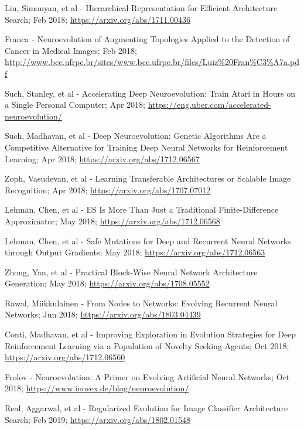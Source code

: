 \documentclass[journal, a4paper]{IEEEtran}
\begin{document}
\begin{thebibliography}{5}
    Liu, Simonyan, et al - Hierarchical Representation for Efficient Architecture Search; Feb 2018;
    \url{https://arxiv.org/abs/1711.00436}

    Franca - Neuroevolution of Augmenting Topologies Applied to the Detection of Cancer in Medical Images; Feb 2018;
    \url{http://www.bcc.ufrpe.br/sites/www.bcc.ufrpe.br/files/Luiz%20Fran%C3%A7a.pdf}

    Such, Stanley, et al - Accelerating Deep Neuroevolution: Train Atari in Hours on a Single Personal Computer; Apr 2018;
    \url{https://eng.uber.com/accelerated-neuroevolution/}

    Such, Madhavan, et al - Deep Neuroevolution: Genetic Algorithms Are a Competitive Alternative for Training Deep Neural Networks for Reinforcement Learning; Apr 2018;
    \url{https://arxiv.org/abs/1712.06567}

    Zoph, Vasudevan, et al - Learning Transferable Architectures or Scalable Image Recognition; Apr 2018;
    \url{https://arxiv.org/abs/1707.07012}

    Lehman, Chen, et al - ES Is More Than Just a Traditional Finite-Difference Approximator; May 2018;
    \url{https://arxiv.org/abs/1712.06568}

    Lehman, Chen, et al - Safe Mutations for Deep and Recurrent Neural Networks through Output Gradients; May 2018;
    \url{https://arxiv.org/abs/1712.06563}

    Zhong, Yan, et al - Practical Block-Wise Neural Network Architecture Generation; May 2018;
    \url{https://arxiv.org/abs/1708.05552}

    Rawal, Miikkulainen - From Nodes to Networks: Evolving Recurrent Neural Networks; Jun 2018;
    \url{https://arxiv.org/abs/1803.04439}

    Conti, Madhavan, et al - Improving Exploration in Evolution Strategies for Deep Reinforcement Learning via a Population of Novelty Seeking Agents; Oct 2018;
    \url{https://arxiv.org/abs/1712.06560}

    Frolov - Neuroevolution: A Primer on Evolving Artificial Neural Networks; Oct 2018;
    \url{https://www.inovex.de/blog/neuroevolution/}

    Real, Aggarwal, et al - Regularized Evolution for Image Classifier Architecture Search; Feb 2019;
    \url{https://arxiv.org/abs/1802.01548}


\end{thebibliography}
\end{document}
